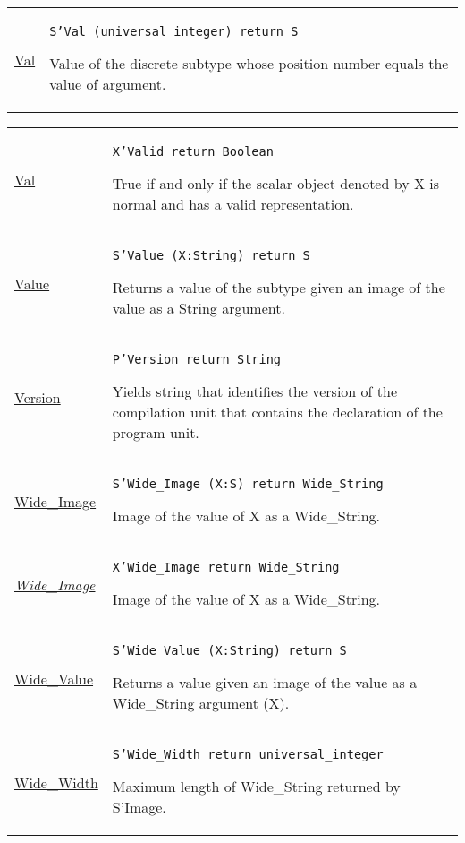 \documentclass[english]{article}
\begin{document}
\begin{scriptsize}
\begin{multicols*}{3}
\begin{tabular}{@{}p{2cm}p{6.5cm}}
   \href{http://www.ada-auth.org/standards/22rm/html/RM-K-2.html}{Val} & \texttt{S'Val (universal\_integer) return S}

   Value of the discrete subtype whose position number equals the value of argument.\\

\end{tabular}
\begin{tabular}{@{}p{2cm}p{6.5cm}}

   \href{http://www.ada-auth.org/standards/22rm/html/RM-K-2.html}{Val} & \texttt{X'Valid return Boolean}

   True if and only if the scalar object denoted by X is normal and has a valid representation.\\

   \href{http://www.ada-auth.org/standards/22rm/html/RM-K-2.html}{Value} & \texttt{S'Value (X:String) return S}

   Returns a value of the subtype given an image of the value as a String argument.\\

   \href{http://www.ada-auth.org/standards/22rm/html/RM-K-2.html}{Version} & \texttt{P'Version return String}

   Yields string that identifies the version of the compilation unit that contains the declaration of the program unit.\\

   \href{http://www.ada-auth.org/standards/22rm/html/RM-K-2.html}{Wide\_Image} & \texttt{S'Wide\_Image (X:S) return Wide\_String}

   Image of the value of X as a Wide\_String.\\

   \href{http://www.ada-auth.org/standards/22rm/html/RM-K-2.html}{\textit{Wide\_Image}} & \texttt{X'Wide\_Image return Wide\_String}

   Image of the value of X as a Wide\_String.\\

   \href{http://www.ada-auth.org/standards/22rm/html/RM-K-2.html}{Wide\_Value} & \texttt{S'Wide\_Value (X:String) return S}

   Returns a value given an image of the value as a Wide\_String argument (X).\\

   \href{http://www.ada-auth.org/standards/22rm/html/RM-K-2.html}{Wide\_Width} & \texttt{S'Wide\_Width return universal\_integer}

   Maximum length of Wide\_String returned by S'Image.\\


\end{tabular}
\end{multicols*}
\end{scriptsize}
\end{document}
